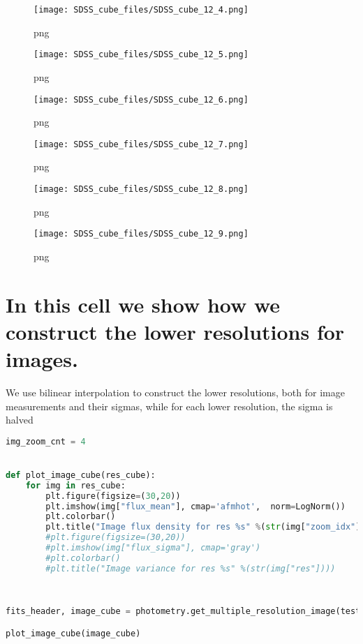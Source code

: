 \begin{figure}
\centering
\texttt{[image: SDSS\_cube\_files/SDSS\_cube\_12\_4.png]}
\caption{png}
\end{figure}

\begin{figure}
\centering
\texttt{[image: SDSS\_cube\_files/SDSS\_cube\_12\_5.png]}
\caption{png}
\end{figure}

\begin{figure}
\centering
\texttt{[image: SDSS\_cube\_files/SDSS\_cube\_12\_6.png]}
\caption{png}
\end{figure}

\begin{figure}
\centering
\texttt{[image: SDSS\_cube\_files/SDSS\_cube\_12\_7.png]}
\caption{png}
\end{figure}

\begin{figure}
\centering
\texttt{[image: SDSS\_cube\_files/SDSS\_cube\_12\_8.png]}
\caption{png}
\end{figure}

\begin{figure}
\centering
\texttt{[image: SDSS\_cube\_files/SDSS\_cube\_12\_9.png]}
\caption{png}
\end{figure}

\section{In this cell we show how we construct the lower resolutions for
images.}\label{in-this-cell-we-show-how-we-construct-the-lower-resolutions-for-images.}

We use bilinear interpolation to construct the lower resolutions, both
for image measurements and their sigmas, while for each lower
resolution, the sigma is halved

\begin{lstlisting}[language=Python]
img_zoom_cnt = 4


def plot_image_cube(res_cube):
    for img in res_cube:
        plt.figure(figsize=(30,20))
        plt.imshow(img["flux_mean"], cmap='afmhot',  norm=LogNorm())
        plt.colorbar()
        plt.title("Image flux density for res %s" %(str(img["zoom_idx"])))
        #plt.figure(figsize=(30,20))
        #plt.imshow(img["flux_sigma"], cmap='gray')
        #plt.colorbar()
        #plt.title("Image variance for res %s" %(str(img["res"])))
       
        

fits_header, image_cube = photometry.get_multiple_resolution_image(test_image, img_zoom_cnt)

plot_image_cube(image_cube)



        
        
        
\end{lstlisting}


